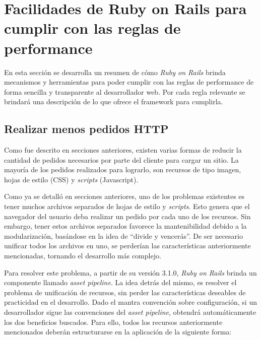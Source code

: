 \section{Facilidades de Ruby on Rails para cumplir con las reglas de performance}

En esta sección se desarrolla un resumen de cómo \emph{Ruby on Rails} brinda mecanismos y herramientas para poder cumplir con las reglas de performance de forma sencilla y transparente al desarrollador web. Por cada regla relevante se brindará una descripción de lo que ofrece el framework para cumplirla.

\subsection{Realizar menos pedidos HTTP}

Como fue descrito en secciones anteriores, existen varias formas de reducir la cantidad de pedidos necesarios por parte del cliente para cargar un sitio. La mayoría de los
pedidos realizados para lograrlo, son recursos de tipo imagen, hojas de estilo (CSS) y \emph{scripts} (Javascript).

Como ya se detalló en secciones anteriores, uno de los problemas existentes es tener muchos archivos separados de hojas de estilo y \emph{scripts}. Esto genera que el navegador
del usuario deba realizar un pedido por cada uno de los recursos. Sin embargo, tener estos archivos separados favorece la mantenibilidad debido a la modularización, basándose en la
idea de ``divide y vencerás''. De ser necesario unificar todos los archivos en uno, se perderían las características anteriormente mencionadas, tornando el desarrollo más complejo.

Para resolver este problema, a partir de su versión 3.1.0, \emph{Ruby on Rails} brinda un componente llamado \emph{asset pipeline}.  La idea detrás del mismo, es resolver el
problema de unificación de recursos, sin perder las características deseables de practicidad en el desarrollo. Dado el mantra convención sobre configuración, si un desarrollador
sigue las convenciones del \emph{asset pipeline}, obtendrá automáticamente los dos beneficios buscados. Para ello, todos los recursos anteriormente mencionados deberán
estructurarse en la aplicación de la siguiente forma:

